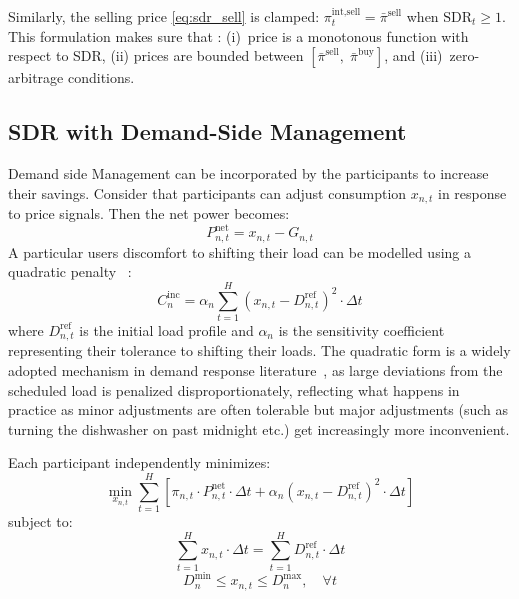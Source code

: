 \documentclass[conference]{IEEEtran}
\begin{document}
Similarly, the selling price \eqref{eq:sdr_sell} is clamped: $\pi_t^{\text{int,sell}} = \bar{\pi}^{\text{sell}}$ when $\text{SDR}_t \geq 1$. This formulation makes sure that : (i)~price is a monotonous function with respect to SDR, (ii) prices are bounded between $[\bar{\pi}^{\text{sell}},\; \bar{\pi}^{\text{buy}}]$, and (iii)~zero-arbitrage conditions.

\subsection{SDR with Demand-Side Management}

Demand side Management can be incorporated by the participants to increase their savings. Consider that participants can adjust consumption $x_{n,t}$ in response to price signals. Then the net power becomes:
\begin{equation}
    P_{n,t}^{\text{net}} = x_{n,t} - G_{n,t}
    \label{eq:dsm_net}
\end{equation}
A particular users discomfort to shifting their load can be modelled using a quadratic penalty ~\cite{alfaverh2023}:
\begin{equation}
    C_{n}^{\text{inc}} = \alpha_n \sum_{t=1}^{H} (x_{n,t} - D_{n,t}^{\text{ref}})^2 \cdot \Delta t
    \label{eq:inconvenience}
\end{equation}
where $D_{n,t}^{\text{ref}}$ is the initial load profile and $\alpha_n$ is the sensitivity coefficient representing their tolerance to shifting their loads. The quadratic form is a widely adopted mechanism in demand response literature~\cite{liu2017, alfaverh2023}, as large deviations from the scheduled load is penalized disproportionately, reflecting what happens in practice as minor adjustments are often tolerable but major adjustments (such as turning the dishwasher on past midnight etc.) get increasingly more inconvenient. 

Each participant independently minimizes:
\begin{equation}
    \min_{x_{n,t}} \sum_{t=1}^{H} \left[ \pi_{n,t} \cdot P_{n,t}^{\text{net}} \cdot \Delta t + \alpha_n (x_{n,t} - D_{n,t}^{\text{ref}})^2 \cdot \Delta t \right]
    \label{eq:objective}
\end{equation}
subject to:
\begin{equation}
    \sum_{t=1}^{H} x_{n,t} \cdot \Delta t = \sum_{t=1}^{H} D_{n,t}^{\text{ref}} \cdot \Delta t
    \label{eq:energy_conservation}
\end{equation}
\begin{equation}
    D_{n}^{\text{min}} \leq x_{n,t} \leq D_{n}^{\text{max}}, \quad \forall t
    \label{eq:load_bounds}
\end{equation}
\end{document}
